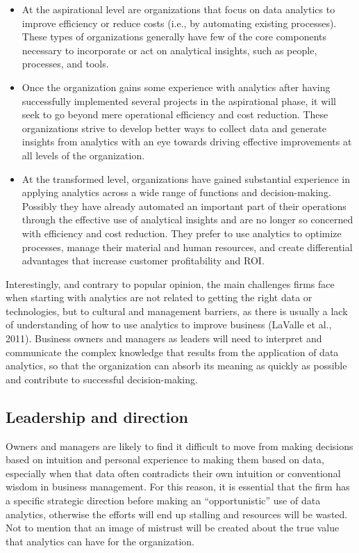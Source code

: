 \documentclass[
  letterpaper,
  DIV=11,
  numbers=noendperiod]{scrreprt}
\begin{document}
\begin{itemize}
\item
  At the aspirational level are organizations that focus on data
  analytics to improve efficiency or reduce costs (i.e., by automating
  existing processes). These types of organizations generally have few
  of the core components necessary to incorporate or act on analytical
  insights, such as people, processes, and tools.
\item
  Once the organization gains some experience with analytics after
  having successfully implemented several projects in the aspirational
  phase, it will seek to go beyond mere operational efficiency and cost
  reduction. These organizations strive to develop better ways to
  collect data and generate insights from analytics with an eye towards
  driving effective improvements at all levels of the organization.
\item
  At the transformed level, organizations have gained substantial
  experience in applying analytics across a wide range of functions and
  decision-making. Possibly they have already automated an important
  part of their operations through the effective use of analytical
  insights and are no longer so concerned with efficiency and cost
  reduction. They prefer to use analytics to optimize processes, manage
  their material and human resources, and create differential advantages
  that increase customer profitability and ROI.
\end{itemize}

Interestingly, and contrary to popular opinion, the main challenges
firms face when starting with analytics are not related to getting the
right data or technologies, but to cultural and management barriers, as
there is usually a lack of understanding of how to use analytics to
improve business (LaValle et al., 2011). Business owners and managers as
leaders will need to interpret and communicate the complex knowledge
that results from the application of data analytics, so that the
organization can absorb its meaning as quickly as possible and
contribute to successful decision-making.

\hypertarget{leadership-and-direction}{%
\subsection{Leadership and direction}\label{leadership-and-direction}}

Owners and managers are likely to find it difficult to move from making
decisions based on intuition and personal experience to making them
based on data, especially when that data often contradicts their own
intuition or conventional wisdom in business management. For this
reason, it is essential that the firm has a specific strategic direction
before making an ``opportunistic'' use of data analytics, otherwise the
efforts will end up stalling and resources will be wasted. Not to
mention that an image of mistrust will be created about the true value
that analytics can have for the organization.
\end{document}
